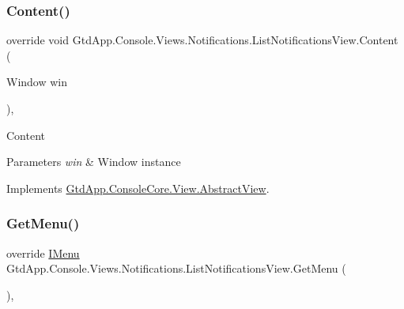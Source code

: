 \subsubsection{\texorpdfstring{Content()}{Content()}}
{\footnotesize\ttfamily override void Gtd\+App.\+Console.\+Views.\+Notifications.\+List\+Notifications\+View.\+Content (\begin{DoxyParamCaption}\item[{Window}]{win }\end{DoxyParamCaption})\hspace{0.3cm}{\ttfamily [protected]}, {\ttfamily [virtual]}}



Content 


\begin{DoxyParams}{Parameters}
{\em win} & Window instance\\
\hline
\end{DoxyParams}


Implements \mbox{\hyperlink{class_gtd_app_1_1_console_core_1_1_view_1_1_abstract_view_a8c518373e635d19875713f2b9f2e1592}{Gtd\+App.\+Console\+Core.\+View.\+Abstract\+View}}.

\mbox{\label{class_gtd_app_1_1_console_1_1_views_1_1_notifications_1_1_list_notifications_view_a00c293c9f8f20a6b9bd75886178a6dae}} 
\subsubsection{\texorpdfstring{Get\+Menu()}{GetMenu()}}
{\footnotesize\ttfamily override \mbox{\hyperlink{interface_gtd_app_1_1_console_core_1_1_menu_1_1_i_menu}{I\+Menu}} Gtd\+App.\+Console.\+Views.\+Notifications.\+List\+Notifications\+View.\+Get\+Menu (\begin{DoxyParamCaption}{ }\end{DoxyParamCaption})\hspace{0.3cm}{\ttfamily [protected]}, {\ttfamily [virtual]}}



